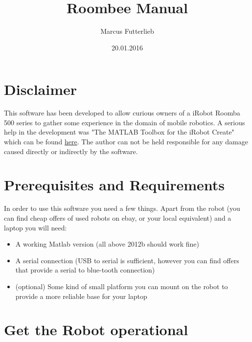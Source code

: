 \documentclass[oneside,12pt,fancychapters]{scrbook} %
\title{Roombee Manual}
\author{Marcus Futterlieb}
\date{20.01.2016}
\begin{document}
\dominitoc
\maketitle

\tableofcontents

\chapter{Disclaimer}
This software has been developed to allow curious owners of a iRobot Roomba 500 series to gather some experience in the domain of mobile robotics. 
A serious help in the development was "The MATLAB Toolbox for the iRobot Create" which can be found \href{http://www.usna.edu/Users/weapsys/esposito/roomba-matlab.php}{here}.
The author can not be held responsible for any damage caused directly or indirectly by the software. 


\chapter{Prerequisites and Requirements}
In order to use this software you need a few things.
Apart from the robot (you can find cheap offers of used robots on ebay, or your local equivalent) and a laptop you will need:
\begin{itemize}
  \item A working Matlab version (all above 2012b should work fine)
  \item A serial connection (USB to serial is sufficient, however you can find offers that provide a serial to blue-tooth connection)
  \item (optional) Some kind of small platform you can mount on the robot to provide a more reliable base for your laptop
\end{itemize}

\chapter{Get the Robot operational}
\end{document}
